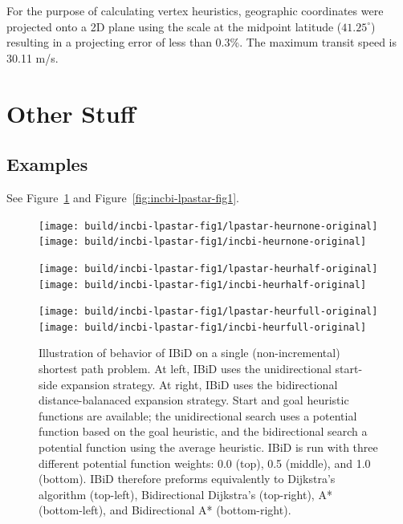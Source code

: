 For the purpose of calculating vertex heuristics,
geographic coordinates were projected onto a 2D plane using the
scale at the midpoint latitude ($41.25^\circ$)
resulting in a projecting error of less than 0.3\%.
The maximum transit speed is 30.11 m/s.

\section{Other Stuff}

\subsection{Examples}

See Figure~\ref{fig:incbi-lpastar-fig1-heurchange}
and Figure~\ref{fig:incbi-lpastar-fig1}.

\begin{figure}
   \centering%
   
   \texttt{[image: build/incbi-lpastar-fig1/lpastar-heurnone-original]}%
   \;\;%
   \texttt{[image: build/incbi-lpastar-fig1/incbi-heurnone-original]}%
   
   \vspace{0.2cm}
   
   \texttt{[image: build/incbi-lpastar-fig1/lpastar-heurhalf-original]}%
   \;\;%
   \texttt{[image: build/incbi-lpastar-fig1/incbi-heurhalf-original]}%
   
   \vspace{0.2cm}
   
   \texttt{[image: build/incbi-lpastar-fig1/lpastar-heurfull-original]}%
   \;\;%
   \texttt{[image: build/incbi-lpastar-fig1/incbi-heurfull-original]}%
   
   \caption{Illustration of behavior of IBiD on a single
      (non-incremental) shortest path problem.
      At left, IBiD uses the unidirectional start-side expansion
      strategy.
      At right, IBiD uses the bidirectional distance-balanaced
      expansion strategy.
      Start and goal heuristic functions are available;
      the unidirectional search uses a potential function based
      on the goal heuristic,
      and the bidirectional search a potential function using
      the average heuristic.
      IBiD is run with three different potential function weights:
      0.0 (top), 0.5 (middle), and 1.0 (bottom).
      IBiD therefore preforms equivalently to
      Dijkstra's algorithm (top-left),
      Bidirectional Dijkstra's (top-right),
      A* (bottom-left),
      and Bidirectional A* (bottom-right).}
   \label{fig:incbi-lpastar-fig1-heurchange}
\end{figure}

